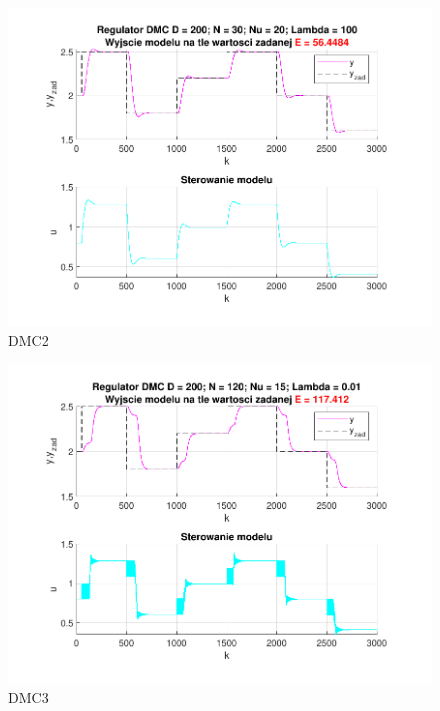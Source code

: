 \begin{figure}[H]
    \centering
    \includegraphics[scale=0.90]{../projekt/zad4_5/DMC_pdf/DMC_2.pdf}
    \caption{DMC2}
\end{figure}


\begin{figure}[H]
    \centering
    \includegraphics[scale=0.90]{../projekt/zad4_5/DMC_pdf/DMC_3.pdf}
    \caption{DMC3}
\end{figure}


